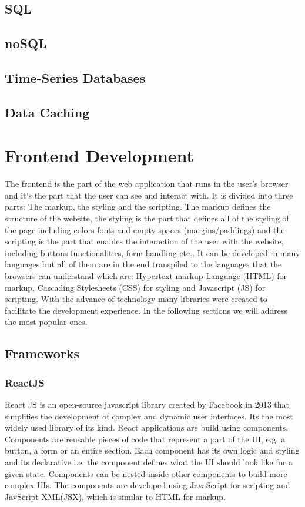 \subsection{SQL}
\subsection{noSQL}
\subsection{Time-Series Databases}
\subsection{Data Caching}

\section{Frontend Development}
The frontend is the part of the web application that runs in the user's
browser and it's the part that the user can see and interact with.
It is divided into three parts: The markup, the styling and the scripting.
The markup defines the structure of the website, the styling is the part that
defines all of the styling of the page including colors fonts and empty spaces
(margins/paddings) and the scripting is the part that enables the interaction
of the user with the website, including buttons functionalities, form handling
etc..
It can be developed in many languages but all of them are in the end transpiled
to the languages that the browsers can understand which are: Hypertext markup
Language (HTML) for markup, Cascading Stylesheets (CSS) for styling and
Javascript (JS) for scripting.
With the advance of technology many libraries were created to facilitate the
development experience. In the following sections we will address the most
popular ones.

\subsection{Frameworks}

\subsubsection{ReactJS}
React JS is an open-source javascript library created by Facebook in 2013 that
simplifies the development of complex and dynamic user interfaces. Its the most widely
used library of its kind.
React applications are build using components. Components are reusable pieces of
code that represent a part of the UI, e.g. a button, a form or an entire section.
Each component has its own logic and styling and its declarative i.e. the
component defines what the UI should look like for a given state.
Components can be nested inside other components to build more complex UIs.
The components are developed using JavaScript for scripting and JavScript XML(JSX),
which is similar to HTML for markup.

